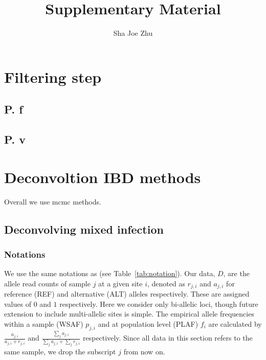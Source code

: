 \documentclass{article}
\title{Supplementary Material}
\author{Sha Joe Zhu}
\date{}
\begin{document}
\maketitle{}
\listoftodos
\clearpage
\setcounter{page}{1}

\maketitle
\tableofcontents

\setcounter{section}{0}

\newpage


\section{Filtering step}
\subsection{P. f}

\subsection{P. v}

\section{Deconvoltion IBD methods}

Overall we use mcmc methods.



\subsection{Deconvolving mixed infection}
\subsubsection{Notations}
We use the same notations as \citet{Zhu2017} (see Table~\ref{tab:notation}). Our data, $D$, are the allele read counts of sample $j$ at a given site $i$, denoted as $r_{j,i}$ and $a_{j,i}$ for reference (REF) and alternative (ALT) alleles respectively.  These are assigned values of $0$ and $1$ respectively. Here we consider only bi-allelic loci, though future extension to include multi-allelic sites is simple.  The empirical allele frequencies within a sample (WSAF) $p_{j,i}$ and at population level (PLAF) $f_i$ are calculated by $ \frac{a_{j,i}}{a_{j,i} + r_{j,i}}$ and $ \frac{\sum_j a_{j,i}}{\sum_j a_{j,i} + \sum_j r_{j,i}}$ respectively. Since all data in this section refers to the same sample, we drop the subscript $j$ from now on.
\end{document}

